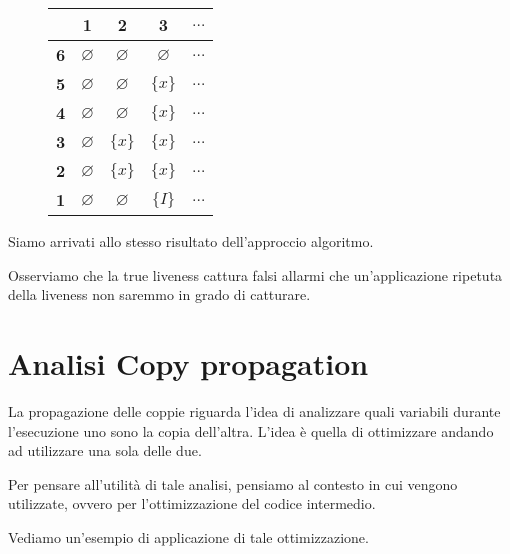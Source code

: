 \begin{figure}[H]
    \centering
    \begin{tabular}{|c|c|c|c|c|}
        \hline
        & \textbf{1} & \textbf{2} & \textbf{3} & \textbf{$\dots$} \\
        \hline
        \textbf{6} &$\varnothing$ & $\varnothing$ & $\varnothing$ & $\dots$ \\
        \hline
        \textbf{5} & $\varnothing$ & $\varnothing$ & $\{x\}$ & $\dots$ \\
        \hline
        \textbf{4} & $\varnothing$ &$\varnothing$ & $\{x\}$ & $\dots$ \\
        \hline
        \textbf{3} & $\varnothing$ & $\{x\}$ & $\{x\}$  & $\dots$ \\
        \hline
        \textbf{2} & $\varnothing$  & $\{x\}$ & $\{x\}$ & $\dots$ \\
        \hline
        \textbf{1} & $\varnothing$  & $\varnothing$ & $\{I\}$ & $\dots$ \\
        \hline
    \end{tabular}
\end{figure}
Siamo arrivati allo stesso risultato dell'approccio algoritmo.

Osserviamo che la true liveness cattura falsi allarmi che un'applicazione ripetuta 
della liveness non saremmo in grado di catturare.

\section{Analisi Copy propagation}
La propagazione delle coppie riguarda l'idea di analizzare quali variabili durante l'esecuzione 
uno sono la copia dell'altra. L'idea è quella di ottimizzare andando ad utilizzare una sola delle due.

Per pensare all'utilità di tale analisi, pensiamo al contesto in cui vengono utilizzate, ovvero 
per l'ottimizzazione del codice intermedio.

Vediamo un'esempio di applicazione di tale ottimizzazione.

